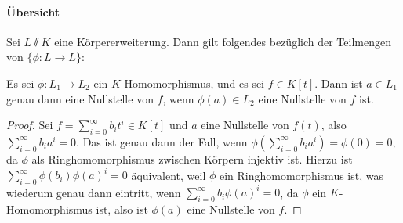 \documentclass[12pt,a4paper]{scrartcl}
\begin{document}
\paragraph{Übersicht} Sei $L\sslash K$ eine Körpererweiterung. Dann gilt folgendes bezüglich der Teilmengen von $\{\phi\colon L\to L\}$:

\begin{center}
\end{center}

\begin{lem}\label{lem:khomonst}
	Es sei $\phi\colon L_1\to L_2$ ein $K$-Homomorphismus, und es sei $f\in K[t]$. Dann ist $a \in L_1$ genau dann eine Nullstelle von $f$, wenn $\phi(a) \in L_2$ eine Nullstelle von $f$ ist.
\end{lem}
\begin{proof}
Sei $f = \sum_{i = 0}^{\infty}b_it^i\in K[t]$ und $a$ eine Nullstelle von $f(t)$, also $\sum_{i = 0}^{\infty}b_ia^i = 0$. Das ist genau dann der Fall, wenn $\phi(\sum_{i = 0}^{\infty}b_ia^i) = \phi(0) = 0$, da $\phi$ als Ringhomomorphismus zwischen Körpern injektiv ist. Hierzu ist $\sum_{i = 0}^{\infty}	\phi(b_i)\phi(a)^i = 0$ äquivalent,  weil $\phi$ ein Ringhomomorphismus ist, was wiederum genau dann eintritt, wenn
$\sum_{i = 0}^{\infty}b_i\phi(a)^i =0$, da $\phi$ ein $K$-Homomorphismus ist, also ist $\phi(a)$ eine Nullstelle von $f$.
\end{proof}
\end{document}
